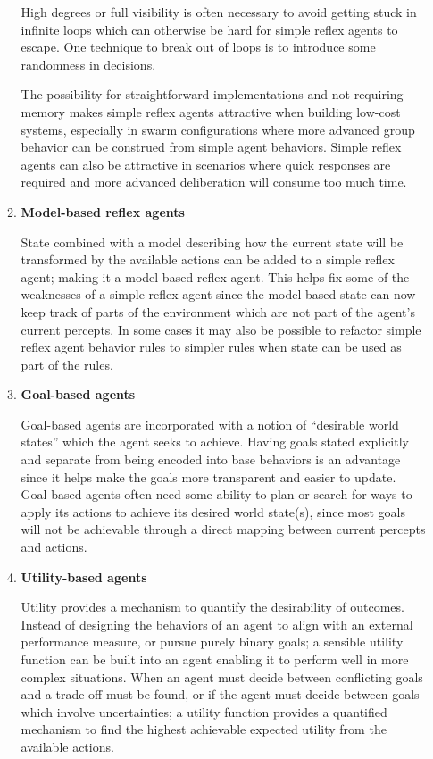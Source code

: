 \begin{enumerate}
\begin{enumerate}
High degrees or full visibility is often necessary to avoid getting stuck in infinite loops which can otherwise be hard for simple reflex agents to escape. One technique to break out of loops is to introduce some randomness in decisions.

The possibility for straightforward implementations and not requiring memory makes simple reflex agents attractive when building low-cost systems, especially in swarm configurations where more advanced group behavior can be construed from simple agent behaviors. Simple reflex agents can also be attractive in scenarios where quick responses are required and more advanced deliberation will consume too much time.

\item \textbf{Model-based reflex agents}\nopagebreak

State combined with a model describing how the current state will be transformed by the available actions can be added to a simple reflex agent; making it a model-based reflex agent. This helps fix some of the weaknesses of a simple reflex agent since the model-based state can now keep track of parts of the environment which are not part of the agent's current percepts. In some cases it may also be possible to refactor simple reflex agent behavior rules to simpler rules when state can be used as part of the rules.

\item \textbf{Goal-based agents}\nopagebreak

Goal-based agents are incorporated with a notion of ``desirable world states'' which the agent seeks to achieve. Having goals stated explicitly and separate from being encoded into base behaviors is an advantage since it helps make the goals more transparent and easier to update. Goal-based agents often need some ability to plan or search for ways to apply its actions to achieve its desired world state(s), since most goals will not be achievable through a direct mapping between current percepts and actions.

\item \textbf{Utility-based agents}\nopagebreak

Utility provides a mechanism to quantify the desirability of outcomes. Instead of designing the behaviors of an agent to align with an external performance measure, or pursue purely binary goals; a sensible utility function can be built into an agent enabling it to perform well in more complex situations. When an agent must decide between conflicting goals and a trade-off must be found, or if the agent must decide between goals which involve uncertainties; a utility function provides a quantified mechanism to find the highest achievable expected utility from the available actions.

\end{enumerate}

\end{enumerate}


